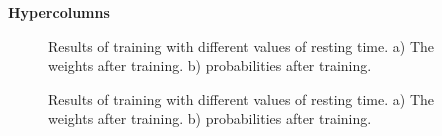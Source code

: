 \documentclass[10pt,a4paper]{article}
\begin{document}
\textbf{Hypercolumns}

\begin{figure}[H]
    \centering
    \qquad
    \caption{Results of training with different values of resting time. a) The weights after training. b) probabilities after training.}
    \label{fig:off_line_learning_hypercolumns}%
\end{figure}

\begin{figure}[H]
    \centering
    \qquad
    \caption{Results of training with different values of resting time. a) The weights after training. b) probabilities after training.}
    \label{fig:off_line_learning_hypercolumns2}%
\end{figure}
\end{document}
